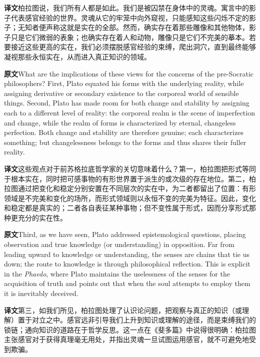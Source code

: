 \documentclass[UTF8,zihao=-4]{ctexart}
\newcommand{\BodyFont}{\fontsize{10.5pt}{15.5pt}\selectfont}
\newcommand{\origlabel}{\textbf{原文}\quad}
\newcommand{\translabel}{\textbf{译文}\quad}
\newcommand{\orig}{\par\noindent\begingroup\BodyFont\origlabel}
\newcommand{\zhline}[1]{\par\endgroup\noindent\begingroup\BodyFont\translabel #1\par\endgroup\vspace{0.35em}}
\begin{document}
\zhline{柏拉图说，我们所有人都是如此。我们是被囚禁在身体中的灵魂。寓言中的影子代表感官经验的世界。灵魂从它的牢笼中向外窥视，只能感知这些闪烁不定的影子；无知者便声称这就是实在的全部。然而，确实存在着那些雕像和其他物体，影子只是它们微弱的表象；也确实存在着人和动物，雕像只是它们不完美的摹本。若要接近这些更高的实在，我们必须摆脱感官经验的束缚，爬出洞穴，直到最终能够凝视那些永恒实在，从而进入真正知识的领域。}

\orig What are the implications of these views for the concerns of the pre-Socratic philosophers? First, Plato equated his forms with the underlying reality, while assigning derivative or secondary existence to the corporeal world of sensible things. Second, Plato has made room for both change and stability by assigning each to a different level of reality: the corporeal realm is the scene of imperfection and change, while the realm of forms is characterized by eternal, changeless perfection. Both change and stability are therefore genuine; each characterizes something; but changelessness belongs to the forms and thus shares their fuller reality.

\zhline{这些观点对于前苏格拉底哲学家的关切意味着什么？第一，柏拉图把形式等同于根本实在，同时把可感事物的有形世界置于派生的或次级的存在地位。第二，柏拉图通过把变化和稳定分别安置在不同层次的实在中，为二者都留出了位置：有形领域是不完美和变化的场所，而形式领域则以永恒不变的完美为特征。因此，变化和稳定都是真实的；二者各自表征某种事物；但不变性属于形式，因而分享形式那种更充分的实在性。}

\orig Third, as we have seen, Plato addressed epistemological questions, placing observation and true knowledge (or understanding) in opposition. Far from leading upward to knowledge or understanding, the senses are chains that tie us down; the route to knowledge is through philosophical reflection. This is explicit in the \textit{Phaedo}, where Plato maintains the uselessness of the senses for the acquisition of truth and points out that when the soul attempts to employ them it is inevitably deceived.

\zhline{第三，如我们所见，柏拉图处理了认识论问题，把观察与真正的知识（或理解）置于对立之中。感官远非引导我们上升到知识或理解的途径，而是束缚我们的锁链；通向知识的道路在于哲学反思。这一点在《斐多篇》中说得很明确：柏拉图主张感官对于获得真理毫无用处，并指出灵魂一旦试图运用感官，就不可避免地受到欺骗。}
\end{document}
